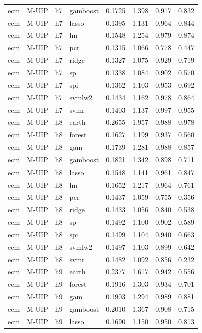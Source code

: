 \begin{ThreePartTable}
\begin{longtable}[t]{llclcccc}
ecm & M-UIP & h7 & gamboost & 0.1725 & 1.398 & 0.917 & 0.832\\
ecm & M-UIP & h7 & lasso & 0.1395 & 1.131 & 0.964 & 0.844\\
ecm & M-UIP & h7 & lm & 0.1548 & 1.254 & 0.979 & 0.874\\
ecm & M-UIP & h7 & pcr & 0.1315 & 1.066 & 0.778 & 0.447\\
ecm & M-UIP & h7 & ridge & 0.1327 & 1.075 & 0.929 & 0.719\\
ecm & M-UIP & h7 & sp & 0.1338 & 1.084 & 0.902 & 0.570\\
ecm & M-UIP & h7 & spi & 0.1362 & 1.103 & 0.953 & 0.692\\
ecm & M-UIP & h7 & svmlw2 & 0.1434 & 1.162 & 0.978 & 0.864\\
ecm & M-UIP & h7 & svmr & 0.1403 & 1.137 & 0.997 & 0.955\\
\addlinespace
ecm & M-UIP & h8 & earth & 0.2655 & 1.957 & 0.988 & 0.978\\
ecm & M-UIP & h8 & forest & 0.1627 & 1.199 & 0.937 & 0.560\\
ecm & M-UIP & h8 & gam & 0.1739 & 1.281 & 0.988 & 0.857\\
ecm & M-UIP & h8 & gamboost & 0.1821 & 1.342 & 0.898 & 0.711\\
ecm & M-UIP & h8 & lasso & 0.1548 & 1.141 & 0.961 & 0.847\\
ecm & M-UIP & h8 & lm & 0.1652 & 1.217 & 0.964 & 0.761\\
ecm & M-UIP & h8 & pcr & 0.1437 & 1.059 & 0.755 & 0.356\\
ecm & M-UIP & h8 & ridge & 0.1433 & 1.056 & 0.840 & 0.538\\
ecm & M-UIP & h8 & sp & 0.1492 & 1.100 & 0.902 & 0.589\\
ecm & M-UIP & h8 & spi & 0.1499 & 1.104 & 0.940 & 0.663\\
ecm & M-UIP & h8 & svmlw2 & 0.1497 & 1.103 & 0.899 & 0.642\\
ecm & M-UIP & h8 & svmr & 0.1482 & 1.092 & 0.856 & 0.232\\
\addlinespace
ecm & M-UIP & h9 & earth & 0.2377 & 1.617 & 0.942 & 0.556\\
ecm & M-UIP & h9 & forest & 0.1916 & 1.303 & 0.934 & 0.701\\
ecm & M-UIP & h9 & gam & 0.1903 & 1.294 & 0.989 & 0.881\\
ecm & M-UIP & h9 & gamboost & 0.2010 & 1.367 & 0.908 & 0.715\\
ecm & M-UIP & h9 & lasso & 0.1690 & 1.150 & 0.950 & 0.813\\

\end{longtable}
\end{ThreePartTable}
